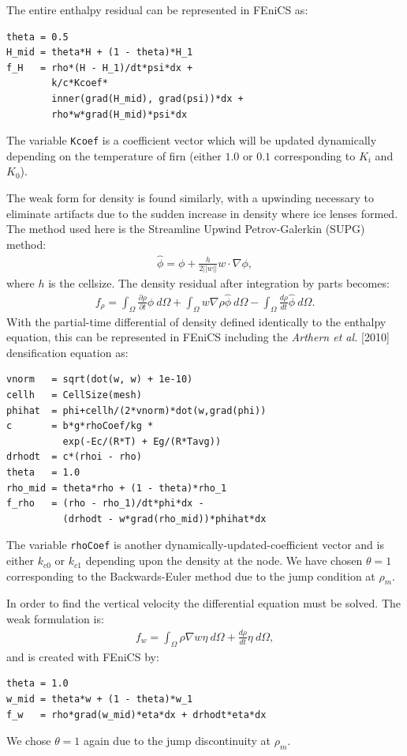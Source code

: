\documentclass{article}%
\begin{document}
The entire enthalpy residual can be represented in FEniCS as:\par
\footnotesize
\begin{verbatim}
theta = 0.5
H_mid = theta*H + (1 - theta)*H_1
f_H   = rho*(H - H_1)/dt*psi*dx + 
        k/c*Kcoef*
        inner(grad(H_mid), grad(psi))*dx + 
        rho*w*grad(H_mid)*psi*dx
\end{verbatim}
\normalsize
The variable \texttt{Kcoef} is a coefficient vector which will be updated dynamically depending on the temperature of firn (either $1.0$ or $0.1$ corresponding to $K_i$ and $K_0$).

The weak form for density is found similarly, with a upwinding necessary to eliminate artifacts due to the sudden increase in density where ice lenses formed.  The method used here is the Streamline Upwind Petrov-Galerkin (SUPG) method:
\begin{align*}
    \hat{\phi} = \phi + \frac{h}{2||w||} w \cdot \nabla{\phi},
\end{align*}
where $h$ is the cellsize.  The density residual after integration by parts becomes:
\begin{align*}
  f_{\rho} = 
    \int_{\Omega} \frac{\partial \rho}{\partial t}\phi\ d \Omega + 
    \int_{\Omega} w\nabla \rho \hat{\phi}\ d \Omega -
    \int_{\Omega}\frac{d \rho}{dt}\hat{\phi}\ d \Omega.
\end{align*}
With the partial-time differential of density defined identically to the enthalpy equation, this can be represented in FEniCS including the \emph{Arthern et al.} [2010] densification equation as:\par
\footnotesize
\begin{verbatim}
vnorm   = sqrt(dot(w, w) + 1e-10)
cellh   = CellSize(mesh)
phihat  = phi+cellh/(2*vnorm)*dot(w,grad(phi))
c       = b*g*rhoCoef/kg * 
          exp(-Ec/(R*T) + Eg/(R*Tavg))
drhodt  = c*(rhoi - rho)
theta   = 1.0
rho_mid = theta*rho + (1 - theta)*rho_1
f_rho   = (rho - rho_1)/dt*phi*dx - 
          (drhodt - w*grad(rho_mid))*phihat*dx
\end{verbatim}
\normalsize
The variable \texttt{rhoCoef} is another dynamically-updated-coefficient vector and is either $k_{c0}$ or $k_{c1}$ depending upon the density at the node.  We have chosen $\theta = 1$ corresponding to the Backwards-Euler method due to the jump condition at $\rho_m$.

In order to find the vertical velocity the differential equation must be solved.  The weak formulation is:
\begin{align*}
  f_{w} = 
    \int_{\Omega} \rho \nabla{w} \eta\ d\Omega + \frac{d\rho}{dt} \eta\ d\Omega,
\end{align*}
and is created with FEniCS by:
\footnotesize
\begin{verbatim}
theta = 1.0
w_mid = theta*w + (1 - theta)*w_1
f_w   = rho*grad(w_mid)*eta*dx + drhodt*eta*dx
\end{verbatim}
\normalsize
We chose $\theta=1$ again due to the jump discontinuity at $\rho_m$.
\end{document}
